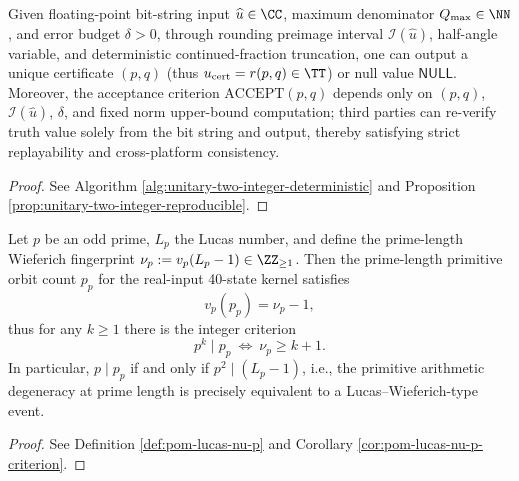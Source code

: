 \begin{conclusion}\label{con:xi-terminal-bitstring-rational-certificate-replayability}
Given floating-point bit-string input \(\widehat u\in\CC\), maximum denominator \(Q_{\max}\in\NN\), and error budget \(\delta>0\),
through rounding preimage interval \(\mathcal I(\widehat u)\), half-angle variable, and deterministic continued-fraction truncation, one can output a unique certificate \((p,q)\) (thus \(u_{\mathrm{cert}}=r(p,q)\in\TT\)) or null value \(\mathsf{NULL}\).
Moreover, the acceptance criterion \(\mathrm{ACCEPT}(p,q)\) depends only on \((p,q)\), \(\mathcal I(\widehat u)\), \(\delta\), and fixed norm upper-bound computation; third parties can re-verify truth value solely from the bit string and output, thereby satisfying strict replayability and cross-platform consistency.
\end{conclusion}
\begin{proof}[Proof]
See Algorithm \ref{alg:unitary-two-integer-deterministic} and Proposition \ref{prop:unitary-two-integer-reproducible}.
\end{proof}

\begin{conclusion}\label{con:xi-terminal-wieferich-fingerprint}
Let \(p\) be an odd prime, \(L_p\) the Lucas number, and define the prime-length Wieferich fingerprint
\(
\nu_p:=v_p(L_p-1)\in\ZZ_{\ge 1}
\).
Then the prime-length primitive orbit count \(p_p\) for the real-input 40-state kernel satisfies
\[
v_p(p_p)=\nu_p-1,
\]
thus for any \(k\ge 1\) there is the integer criterion
\[
p^k\mid p_p\ \Longleftrightarrow\ \nu_p\ge k+1.
\]
In particular, \(p\mid p_p\) if and only if \(p^2\mid(L_p-1)\), i.e., the primitive arithmetic degeneracy at prime length is precisely equivalent to a Lucas--Wieferich-type event.
\end{conclusion}
\begin{proof}[Proof]
See Definition \ref{def:pom-lucas-nu-p} and Corollary \ref{cor:pom-lucas-nu-p-criterion}.
\end{proof}

